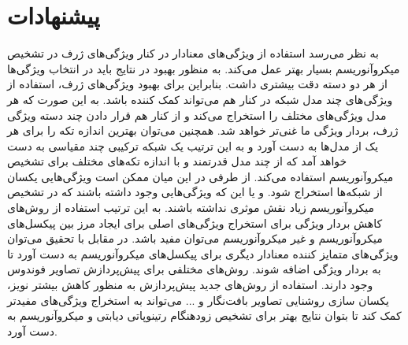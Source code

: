 \section{پیشنهادات}
به نظر می‌رسد استفاده از ویژگی‌های معنادار در کنار ویژگی‌های ژرف در تشخیص میکروآنوریسم بسیار بهتر عمل می‌کند. به منظور بهبود در نتایج باید در انتخاب ویژگی‌ها از هر دو دسته دقت بیشتری داشت.
بنابراین برای بهبود ویژگی‌های ژرف، استفاده از ویژگی‌های چند مدل شبکه در کنار هم می‌تواند کمک کننده باشد. به این صورت که هر مدل ویژگی‌های مختلف را استخراج می‌کند و از کنار هم قرار دادن چند دسته ویژگی ژرف، بردار ویژگی ما غنی‌تر خواهد شد. 
\noindent
همچنین می‌توان بهترین اندازه تکه را برای هر یک از مدل‌ها به دست آورد و به این ترتیب یک شبکه ترکیبی چند مقیاسی به دست خواهد آمد که از چند مدل‌ قدرتمند و با اندازه تکه‌های مختلف برای تشخیص میکروآنوریسم استفاده می‌کند. 
\noindent
از طرفی در این میان ممکن است ویژگی‌هایی یکسان از شبکه‌ها استخراج شود. و یا این که ویژگی‌هایی وجود داشته باشند که در تشخیص میکروآنوریسم زیاد نقش موثری نداشته باشند. به این ترتیب استفاده از روش‌های کاهش بردار ویژگی برای استخراج ویژگی‌های اصلی برای ایجاد مرز بین پیکسل‌های میکروآنوریسم و غیر میکروآنوریسم می‌توان مفید باشد.
در مقابل با تحقیق می‌توان ویژگی‌های متمایز کننده معنادار دیگری برای پیکسل‌های میکروآنوریسم به دست آورد تا به بردار ویژگی اضافه شوند.
روش‌های مختلفی برای پیش‌پردازش تصاویر فوندوس وجود دارند. استفاده از روش‌های جدید پیش‌پردازش به منظور کاهش بیشتر نویز، یکسان‌ سازی روشنایی تصاویر بافت‌نگار و ... می‌تواند به استخراج ویژگی‌های مفیدتر کمک کند تا بتوان نتایج بهتر برای تشخیص زودهنگام رتینوپاتی دیابتی و میکروآنوریسم به دست آورد.
